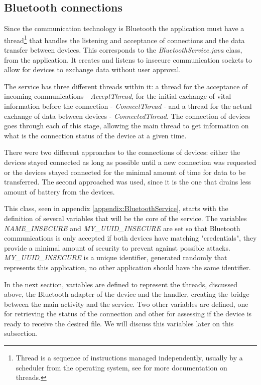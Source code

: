 \subsection{Bluetooth connections}
\label{subsec:btconn}

Since the communication technology is Bluetooth the application must have a thread\footnote{Thread is a sequence of instructions managed independently, usually by a scheduler from the operating system, see \cite{threads} for more documentation on threads.} that handles the listening and acceptance of connections and the data transfer between devices. This corresponds to the \textit{BluetoothService.java} class, from the application. It creates and listens to insecure communication sockets to allow for devices to exchange data without user approval.

The service has three different threads within it: a thread for the acceptance of incoming communications - \textit{AcceptThread}, for the initial exchange of vital information before the connection - \textit{ConnectThread} - and a thread for the actual exchange of data between devices - \textit{ConnectedThread}. The connection of devices goes through each of this stage, allowing the main thread to get information on what is the connection status of the device at a given time.

There were two different approaches to the connections of devices: either the devices stayed connected as long as possible until a new connection was requested or the devices stayed connected for the minimal amount of time for data to be transferred. The second approached was used, since it is the one that drains less amount of battery from the devices.

This class, seen in appendix \ref{appendix:BluetoothService}, starts with the definition of several variables that will be the core of the service. The variables \textit{NAME\_INSECURE} and \textit{MY\_UUID\_INSECURE} are set so that Bluetooth communications is only accepted if both devices have matching "credentials", they provide a minimal amount of security to prevent against possible attacks. \textit{MY\_UUID\_INSECURE} is a unique identifier, generated randomly that represents this application, no other application should have the same identifier.

In the next section, variables are defined to represent the threads, discussed above, the Bluetooth adapter of the device and the handler, creating the bridge between the main activity and the service. Two other variables are defined, one for retrieving the status of the connection and other for assessing if the device is ready to receive the desired file. We will discuss this variables later on this subsection.

